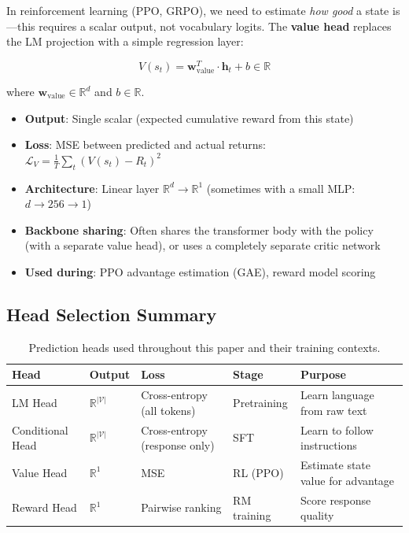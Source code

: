In reinforcement learning (PPO, GRPO), we need to estimate \emph{how good} a state is---this requires a scalar output, not vocabulary logits. The \textbf{value head} replaces the LM projection with a simple regression layer:

\begin{equation}
V(s_t) = \mathbf{w}_{\text{value}}^T \cdot \mathbf{h}_t + b \in \mathbb{R}
\end{equation}

where $\mathbf{w}_{\text{value}} \in \mathbb{R}^d$ and $b \in \mathbb{R}$.

\begin{keybox}
\begin{itemize}
  \item \textbf{Output}: Single scalar (expected cumulative reward from this state)
  \item \textbf{Loss}: MSE between predicted and actual returns: $\mathcal{L}_V = \frac{1}{T}\sum_t (V(s_t) - R_t)^2$
  \item \textbf{Architecture}: Linear layer $\mathbb{R}^d \to \mathbb{R}^1$ (sometimes with a small MLP: $d \to 256 \to 1$)
  \item \textbf{Backbone sharing}: Often shares the transformer body with the policy (with a separate value head), or uses a completely separate critic network
  \item \textbf{Used during}: PPO advantage estimation (GAE), reward model scoring
\end{itemize}
\end{keybox}

\subsection{Head Selection Summary}
\label{head-selection-summary}

\begin{table}[ht!]
\centering
\caption{Prediction heads used throughout this paper and their training contexts.}
\begin{tabular}{@{}lp{2.5cm}p{2.8cm}p{2.8cm}p{2.8cm}@{}}
\toprule
\textbf{Head} & \textbf{Output} & \textbf{Loss} & \textbf{Stage} & \textbf{Purpose} \\
\midrule
LM Head & $\mathbb{R}^{|\mathcal{V}|}$ & Cross-entropy (all tokens) & Pretraining & Learn language from raw text \\
Conditional Head & $\mathbb{R}^{|\mathcal{V}|}$ & Cross-entropy (response only) & SFT & Learn to follow instructions \\
Value Head & $\mathbb{R}^1$ & MSE & RL (PPO) & Estimate state value for advantage \\
Reward Head & $\mathbb{R}^1$ & Pairwise ranking & RM training & Score response quality \\
\bottomrule
\end{tabular}
\end{table}

